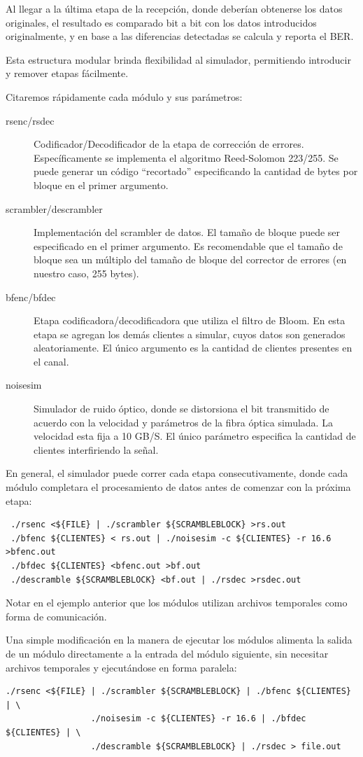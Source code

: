 Al llegar a la última etapa de la recepción, donde deberían obtenerse los datos originales, el resultado es comparado bit a bit con los datos introducidos originalmente, y en base a las diferencias detectadas se calcula y reporta el BER.

Esta estructura modular brinda flexibilidad al simulador, permitiendo introducir y remover etapas fácilmente.

Citaremos rápidamente cada módulo y sus parámetros:
\begin{description}
 \item[rsenc/rsdec] Codificador/Decodificador de la etapa de corrección de errores. Específicamente se implementa el algoritmo Reed-Solomon 223/255. Se puede generar un código ``recortado'' especificando la cantidad de bytes por bloque en el primer argumento.
 \item[scrambler/descrambler] Implementación del scrambler de datos. El tamaño de bloque puede ser especificado en el primer argumento. Es recomendable que el tamaño de bloque sea un múltiplo del tamaño de bloque del corrector de errores (en nuestro caso, 255 bytes).
 \item[bfenc/bfdec] Etapa codificadora/decodificadora que utiliza el filtro de Bloom. En esta etapa se agregan los demás clientes a simular, cuyos datos son generados aleatoriamente. El único argumento es la cantidad de clientes presentes en el canal.
 \item[noisesim] Simulador de ruido óptico, donde se distorsiona el bit transmitido de acuerdo con la velocidad y parámetros de la fibra óptica simulada. La velocidad esta fija a 10 GB/S. El único parámetro especifica la cantidad de clientes interfiriendo la señal.
\end{description}

En general, el simulador puede correr cada etapa consecutivamente, donde cada módulo completara el procesamiento de datos antes de comenzar con la próxima etapa:

\small
\begin{verbatim}
 ./rsenc <${FILE} | ./scrambler ${SCRAMBLEBLOCK} >rs.out
 ./bfenc ${CLIENTES} < rs.out | ./noisesim -c ${CLIENTES} -r 16.6 >bfenc.out
 ./bfdec ${CLIENTES} <bfenc.out >bf.out
 ./descramble ${SCRAMBLEBLOCK} <bf.out | ./rsdec >rsdec.out
\end{verbatim}
\normalsize
Notar en el ejemplo anterior que los módulos utilizan archivos temporales como forma de comunicación.

Una simple modificación en la manera de ejecutar los módulos alimenta la salida de un módulo directamente a la entrada del módulo siguiente, sin necesitar archivos temporales y ejecutándose en forma paralela:
\small
\begin{verbatim}
./rsenc <${FILE} | ./scrambler ${SCRAMBLEBLOCK} | ./bfenc ${CLIENTES} | \
                 ./noisesim -c ${CLIENTES} -r 16.6 | ./bfdec ${CLIENTES} | \ 
                 ./descramble ${SCRAMBLEBLOCK} | ./rsdec > file.out
\end{verbatim}
\normalsize


